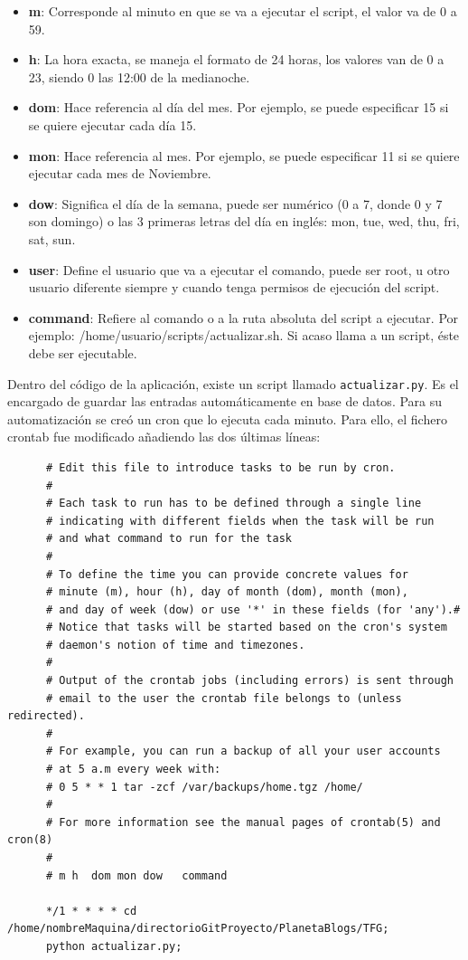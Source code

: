 \documentclass[a4paper, 12pt]{book}
\begin{document}
\begin{itemize}
  \item {\bfseries m}: Corresponde al minuto en que se va a ejecutar el script, el valor va de 0 a 59.
  \item {\bfseries h}: La hora exacta, se maneja el formato de 24 horas, los valores van de 0 a 23, siendo 0 las 12:00 de la medianoche.
  \item {\bfseries dom}: Hace referencia al d\'ia del mes. Por ejemplo, se puede especificar 15 si se quiere ejecutar cada d\'ia 15.
  \item {\bfseries mon}: Hace referencia al mes. Por ejemplo, se puede especificar 11 si se quiere ejecutar cada mes de Noviembre.
  \item {\bfseries dow}: Significa el d\'ia de la semana, puede ser num\'erico (0 a 7, donde 0 y 7 son domingo) o las 3 primeras letras del d\'ia en 
  ingl\'es: mon, tue, wed, thu, fri, sat, sun.
  \item {\bfseries user}: Define el usuario que va a ejecutar el comando, puede ser root, u otro usuario diferente siempre y cuando tenga permisos de 
  ejecuci\'on del script.
  \item {\bfseries command}: Refiere al comando o a la ruta absoluta del script a ejecutar. Por ejemplo: /home/usuario/scripts/actualizar.sh. Si acaso 
  llama a un script, \'este debe ser ejecutable.
\end{itemize}
Dentro del c\'odigo de la aplicaci\'on, existe un script llamado \texttt{actualizar.py}. Es el encargado de guardar las entradas autom\'aticamente en base
de datos. Para su automatizaci\'on se cre\'o un cron que lo ejecuta cada minuto. Para ello, el fichero crontab fue modificado a\~nadiendo las dos \'ultimas 
l\'ineas: 
{\footnotesize\begin{verbatim} 
      # Edit this file to introduce tasks to be run by cron.
      # 
      # Each task to run has to be defined through a single line
      # indicating with different fields when the task will be run
      # and what command to run for the task
      # 
      # To define the time you can provide concrete values for
      # minute (m), hour (h), day of month (dom), month (mon),
      # and day of week (dow) or use '*' in these fields (for 'any').# 
      # Notice that tasks will be started based on the cron's system
      # daemon's notion of time and timezones.
      # 
      # Output of the crontab jobs (including errors) is sent through
      # email to the user the crontab file belongs to (unless redirected).
      # 
      # For example, you can run a backup of all your user accounts
      # at 5 a.m every week with:
      # 0 5 * * 1 tar -zcf /var/backups/home.tgz /home/
      # 
      # For more information see the manual pages of crontab(5) and cron(8)
      # 
      # m h  dom mon dow   command
      
      */1 * * * * cd /home/nombreMaquina/directorioGitProyecto/PlanetaBlogs/TFG;
      python actualizar.py; 
\end{verbatim}}
\end{document}
